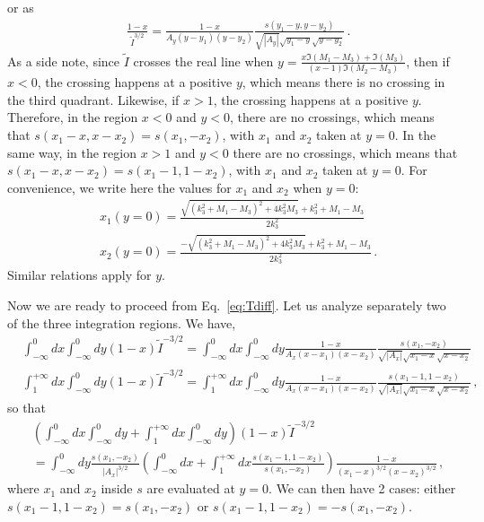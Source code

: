 \documentclass[twoside]{article}
\begin{document}
or as 
\begin{equation}
\begin{split}
&\frac{1-x}{\tilde{I}^{3/2}}=\frac{1-x}{A_y (y-y_1)(y-y_2)}\frac{s(y_1-y,y-y_2)}{\sqrt{|A_y|}\sqrt{y_1-y}\sqrt{y-y_2}}\,.
\end{split}
\end{equation}
As a side note, since $\tilde{I}$ crosses the real line when $y = \frac{x \Im(M_1-M_3)+\Im(M_3)}{(x-1) \Im(M_2-M_3)}$, then if $x<0$,
the crossing happens at a positive $y$, which means there is no crossing in the third quadrant. 
Likewise, if $x>1$, the crossing happens at a positive $y$. 
Therefore, in the region $x<0$ and $y<0$, there are no crossings, which means that $s(x_1-x,x-x_2) = s(x_1,-x_2)$, with $x_1$ and $x_2$ taken at $y=0$. 
In the same way, in the region $x>1$ and $y<0$ there are no crossings, which means that $s(x_1-x,x-x_2) = s(x_1-1,1-x_2)$, with $x_1$ and $x_2$ taken at $y=0$.
For convenience, we write here the values for $x_1$ and $x_2$ when $y=0$:
\begin{align}
&x_1(y=0) = \frac{\sqrt{(k_3^2 + M_1 - M_3)^2+4 k_3^2 M_3}+k_3^2 +M_1-M_3}{2 k_3^2}\\
&x_2(y=0) = \frac{-\sqrt{(k_3^2 + M_1 - M_3)^2+4 k_3^2 M_3}+k_3^2 +M_1-M_3}{2 k_3^2}\,.
\end{align} 
Similar relations apply for $y$.

Now we are ready to proceed from Eq.~\eqref{eq:Tdiff}. Let us analyze separately two of the three integration regions. We have,
\begin{align}
&\int_{-\infty}^0 dx \int_{-\infty}^0 dy (1-x)\tilde{I}^{-3/2} = \int_{-\infty}^0 dx \int_{-\infty}^0 dy \frac{1-x}{A_x (x-x_1)(x-x_2)}\frac{s(x_1,-x_2)}{\sqrt{|A_x|}\sqrt{x_1-x}\sqrt{x-x_2}} \\
&\int_{1}^{+\infty} dx \int_{-\infty}^{0}dy (1-x)\tilde{I}^{-3/2}
= \int_{1}^{+\infty} dx \int_{-\infty}^{0}dy \frac{1-x}{A_x (x-x_1)(x-x_2)}\frac{s(x_1-1,1-x_2)}{\sqrt{|A_x|}\sqrt{x_1-x}\sqrt{x-x_2}}\,,
\end{align}
so that 
\begin{equation}
\label{eq:part1T}
\begin{split}
&\left(\int_{-\infty}^0 dx \int_{-\infty}^0 dy 
+ \int_{1}^{+\infty} dx \int_{-\infty}^{0}dy\right) (1-x)\tilde{I}^{-3/2}\\
& = \int_{-\infty}^0 dy \frac{s(x_1,-x_2)}{|A_x|^{3/2}} \left(\int_{-\infty}^0 dx 
+ \int_{1}^{+\infty} dx \frac{s(x_1-1,1-x_2)}{s(x_1,-x_2)}\right) \frac{1-x}{(x_1-x)^{3/2}(x-x_2)^{3/2}}\,,
\end{split}
\end{equation}
where $x_1$ and $x_2$ inside $s$ are evaluated at $y=0$.
We can then have 2 cases: either $s(x_1-1,1-x_2)=s(x_1,-x_2)$ or $s(x_1-1,1-x_2)=-s(x_1,-x_2)$. 
\end{document}
